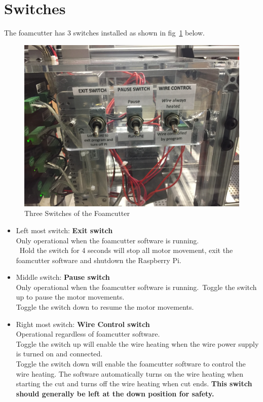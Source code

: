 \documentclass[titlepage,12pt,letter]{report}
\numberwithin{equation}{chapter}
\begin{document}
\section{Switches}
The foamcutter has 3 switches installed as shown in fig~\ref{fig:switch} below.
\begin{figure} [H]
	\includegraphics[width = 0.8\linewidth]{./Figures/electric.jpg}
	\caption{Three Switches of the Foamcutter}
	\label{fig:switch}
\end{figure}
\begin{itemize}[itemsep = 5pt,topsep=0pt]
	\item Left most switch: \textbf{Exit switch} \\
	Only operational when the foamcutter software is running. \\\
	Hold the switch for 4 seconds will stop all motor movement, exit the foamcutter software and shutdown the Raspberry Pi.
	\item Middle switch: \textbf{Pause switch}\\
	Only operational when the foamcutter software is running.\
	Toggle the switch up to pause the motor movements. \\
	Toggle the switch down to resume the motor movements.
	\item Right most switch: \textbf{Wire Control switch}\\
	Operational regardless of foamcutter software.\\
	Toggle the switch up will enable the wire heating when the wire power supply is turned on and connected.\\
	Toggle the switch down will enable the foamcutter software to control the wire heating. The software automatically turns on the wire heating when starting the cut and turns off the wire heating when cut ends. \textbf{This switch should generally be left at the down position for safety.}
\end{itemize}
\end{document}
